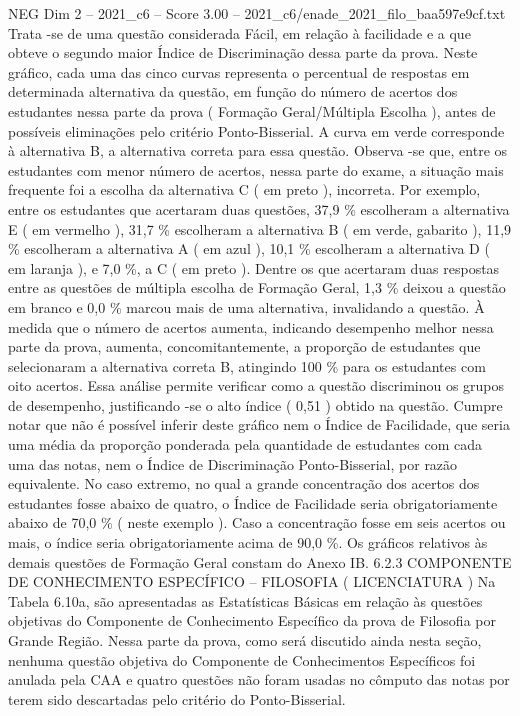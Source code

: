 \begin{textsample}{NEG Dim 2 – 2021\_c6 – Score 3.00 – 2021\_c6/enade\_2021\_filo\_baa597e9cf.txt}
Trata -se de uma questão considerada Fácil, em relação à facilidade e a que obteve o segundo maior Índice de Discriminação dessa parte da prova.
Neste gráfico, cada uma das cinco curvas representa o percentual de respostas em determinada alternativa da questão, em função do número de acertos dos estudantes nessa parte da prova ( Formação Geral/Múltipla Escolha ), antes de possíveis eliminações pelo critério Ponto-Bisserial.
A curva em verde corresponde à alternativa B, a alternativa correta para essa questão.
Observa -se que, entre os estudantes com menor número de acertos, nessa parte do exame, a situação mais frequente foi a escolha da alternativa C ( em preto ), incorreta.
Por exemplo, entre os estudantes que acertaram duas questões, 37,9 \% escolheram a alternativa E ( em vermelho ), 31,7 \% escolheram a alternativa B ( em verde, gabarito ), 11,9 \% escolheram a alternativa A ( em azul ), 10,1 \% escolheram a alternativa D ( em laranja ), e 7,0 \%, a C ( em preto ).
Dentre os que acertaram duas respostas entre as questões de múltipla escolha de Formação Geral, 1,3 \% deixou a questão em branco e 0,0 \% marcou mais de uma alternativa, invalidando a questão.
À medida que o número de acertos aumenta, indicando desempenho melhor nessa parte da prova, aumenta, concomitantemente, a proporção de estudantes que selecionaram a alternativa correta B, atingindo 100 \% para os estudantes com oito acertos.
Essa análise permite verificar como a questão discriminou os grupos de desempenho, justificando -se o alto índice ( 0,51 ) obtido na questão.
Cumpre notar que não é possível inferir deste gráfico nem o Índice de Facilidade, que seria uma média da proporção ponderada pela quantidade de estudantes com cada uma das notas, nem o Índice de Discriminação Ponto-Bisserial, por razão equivalente.
No caso extremo, no qual a grande concentração dos acertos dos estudantes fosse abaixo de quatro, o Índice de Facilidade seria obrigatoriamente abaixo de 70,0 \% ( neste exemplo ).
Caso a concentração fosse em seis acertos ou mais, o índice seria obrigatoriamente acima de 90,0 \%.
Os gráficos relativos às demais questões de Formação Geral constam do Anexo IB. 6.2.3 COMPONENTE DE CONHECIMENTO ESPECÍFICO – FILOSOFIA ( LICENCIATURA ) Na Tabela 6.10a, são apresentadas as Estatísticas Básicas em relação às questões objetivas do Componente de Conhecimento Específico da prova de Filosofia por Grande Região.
Nessa parte da prova, como será discutido ainda nesta seção, nenhuma questão objetiva do Componente de Conhecimentos Específicos foi anulada pela CAA e quatro questões não foram usadas no cômputo das notas por terem sido descartadas pelo critério do Ponto-Bisserial.

\end{textsample}
